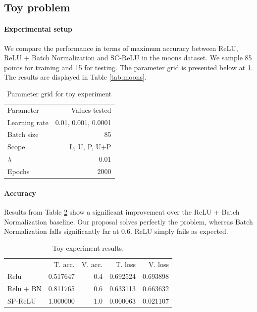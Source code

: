 
\subsection{Toy problem}
\paragraph{Experimental setup} We compare the performance in terms of maximum accuracy between ReLU, ReLU + Batch Normalization and SC-ReLU in the moons dataset. We sample 85 points for training and 15 for testing. The parameter grid is presented below at 
\ref{tab:grid_toy}. The results are displayed in Table \ref{tab:moons}.

\begin{table}[h]
\centering
\begin{tabular}{lr}
\hline
{Parameter} &         Values tested \\
%
Learning rate &  0.01, 0.001, 0.0001 \\
Batch size    &                     85 \\
Scope         &           L, U, P, U+P \\
$\lambda$          &                   0.01 \\
Epochs & 2000 \\
\hline
\end{tabular}
\caption{Parameter grid for toy experiment}
  \label{tab:grid_toy}
\end{table}

\paragraph{Accuracy} Results from Table \ref{tab:toy} show a significant improvement over the ReLU + Batch Normalization baseline. Our proposal solves perfectly the problem, whereas Batch Normalization falls significantly far at 0.6. ReLU simply fails as expected.

\begin{table}[h]
\centering
\begin{tabular}{lrrrr}
{} &       T. acc. &   V. acc. &      T. loss &  V. loss \\
Relu            &  0.517647 &      0.4 &  0.692524 &  0.693898 \\
Relu + BN     &  0.811765 &      0.6 &  0.633113 &  0.663632 \\
SP-ReLU &  1.000000 &      1.0 &  0.000063 &  0.021107 \\
\end{tabular}
\caption{Toy experiment results.}
  \label{tab:toy}
\end{table}

